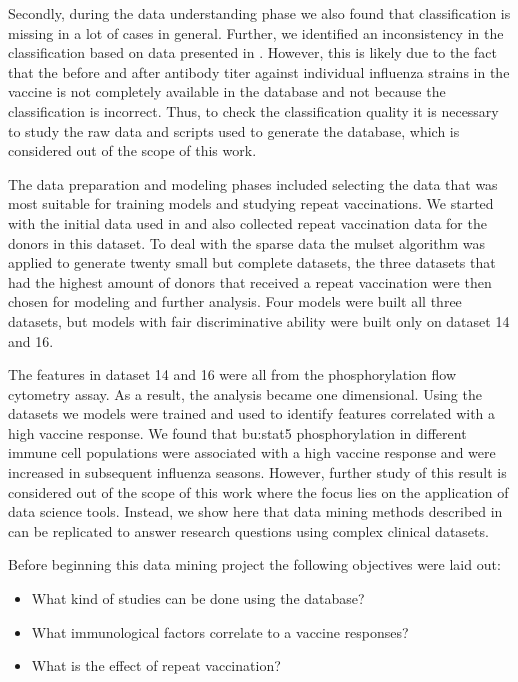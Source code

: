 Secondly, during the data understanding phase we also found that classification is missing in a lot of cases in general.
Further, we identified an inconsistency in the classification based on data presented in \flup.
However, this is likely due to the fact that the before and after antibody titer against individual influenza strains in the vaccine is not completely available in the database and not because the classification is incorrect.
Thus, to check the classification quality it is necessary to study the raw data and scripts used to generate the database, which is considered out of the scope of this work.

The data preparation and modeling phases included selecting the data that was most suitable for training models and studying repeat vaccinations.
We started with the initial data used in \spaper and also collected repeat vaccination data for the donors in this dataset.
To deal with the sparse data the mulset algorithm was applied to generate twenty small but complete datasets, the three datasets that had the highest amount of donors that received a repeat vaccination were then chosen for modeling and further analysis.
Four models were built all three datasets, but models with fair discriminative ability were built only on dataset 14 and 16.

The features in dataset 14 and 16 were all from the phosphorylation flow cytometry assay.
As a result, the analysis became one dimensional.
Using the datasets we models were trained and used to identify features correlated with a high vaccine response.
We found that \gls{bu:stat}5 phosphorylation in different immune cell populations were associated with a high vaccine response and were increased in subsequent influenza seasons.
However, further study of this result is considered out of the scope of this work where the focus lies on the application of data science tools.
Instead, we show here that data mining methods described in \spaper can be replicated to answer research questions using complex clinical datasets.

Before beginning this data mining project the following objectives were laid out:
\begin{itemize}
        \item What kind of studies can be done using the \flup database?
        \item What immunological factors correlate to a vaccine responses?
        \item What is the effect of repeat vaccination?
\end{itemize}

